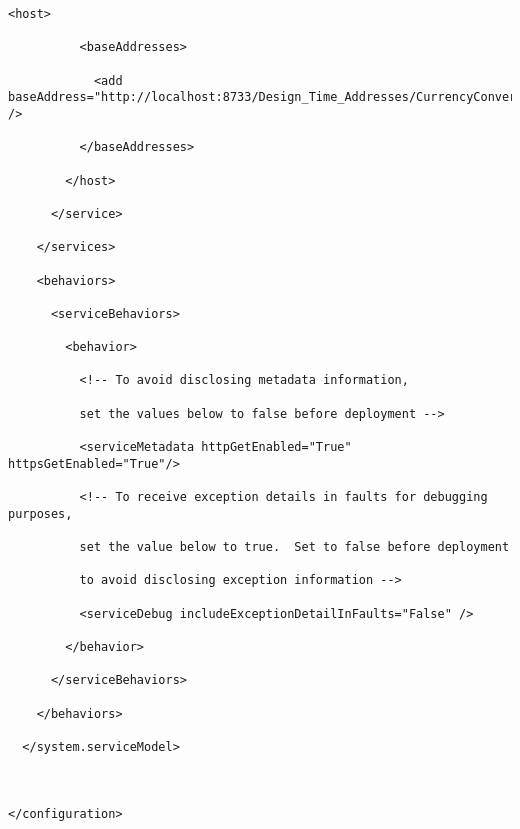 \documentclass[a4paper,10pt]{scrreprt}
\begin{document}
\begin{lstlisting}[caption=wcf example]
        <host>

          <baseAddresses>

            <add baseAddress="http://localhost:8733/Design_Time_Addresses/CurrencyConverterService/Service1/" />

          </baseAddresses>

        </host>

      </service>

    </services>

    <behaviors>

      <serviceBehaviors>

        <behavior>

          <!-- To avoid disclosing metadata information, 

          set the values below to false before deployment -->

          <serviceMetadata httpGetEnabled="True" httpsGetEnabled="True"/>

          <!-- To receive exception details in faults for debugging purposes, 

          set the value below to true.  Set to false before deployment 

          to avoid disclosing exception information -->

          <serviceDebug includeExceptionDetailInFaults="False" />

        </behavior>

      </serviceBehaviors>

    </behaviors>

  </system.serviceModel>



</configuration>
\end{lstlisting}
\end{document}
